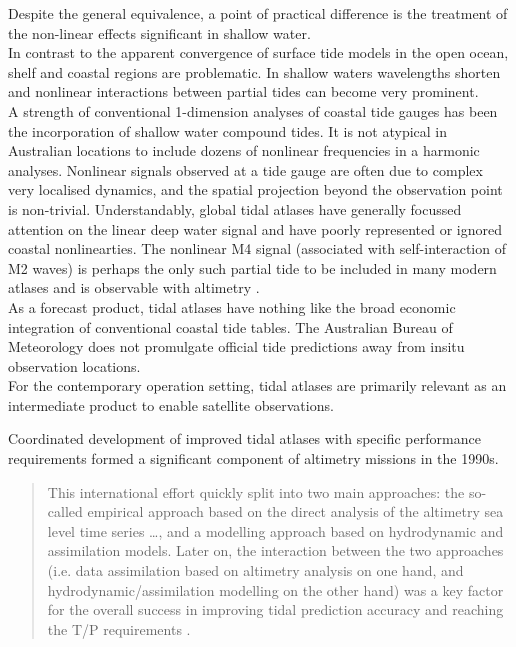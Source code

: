 Despite the general equivalence, a point of practical difference is the treatment of the non-linear effects significant in shallow water.\\
In contrast to the apparent convergence of surface tide models in the open ocean, shelf and coastal regions are problematic.   In shallow waters wavelengths shorten and nonlinear interactions between partial tides can become very prominent.  \\
A strength of conventional 1-dimension analyses of coastal tide gauges has been the incorporation of shallow water compound tides.  It is not atypical in Australian locations to include dozens of nonlinear frequencies in a harmonic analyses.   Nonlinear signals observed at a tide gauge are often due to complex very localised dynamics, and the spatial projection beyond the observation point is non-trivial.  Understandably, global tidal atlases have generally focussed attention on the linear deep water signal and have poorly represented or ignored coastal nonlinearties.  The nonlinear M4 signal (associated with self-interaction of M2 waves) is perhaps the only such partial tide to be included in many modern atlases and is observable with altimetry \cite{Ray:2010jm}.\\



As a forecast product, tidal atlases have nothing like the broad economic integration of conventional coastal tide tables.  The Australian Bureau of Meteorology does not promulgate official tide predictions away from insitu observation locations. \\
For the contemporary operation setting, tidal atlases are primarily relevant as an intermediate product to enable satellite observations.



Coordinated development of improved tidal atlases with specific performance requirements formed a significant component of altimetry missions in the 1990s.
\begin{quotation}
This international effort quickly split into two main approaches: the so-called empirical approach based on the direct analysis of the altimetry sea level time series \dots{}, and a modelling approach based on hydrodynamic and assimilation models. Later on, the interaction between the two approaches (i.e. data assimilation based on altimetry analysis on one hand, and hydrodynamic/assimilation modelling on the other hand) was a key factor for the overall success in improving tidal prediction accuracy and reaching the T/P requirements \cite[pp394]{Lefevre:2011dg}.
\end{quotation}




